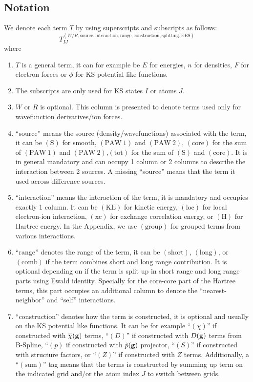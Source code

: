 \documentclass[paper=a4, fontsize=11pt]{article} %
\numberwithin{equation}{section} %
\numberwithin{figure}{section} %
\numberwithin{table}{section} %
\newcommand{\ol}{\overline}
\newcommand{\bg}{{\bf{g}}}
\newcommand{\rS}{{\mathrm{S}}}
\newcommand{\rKE}{{\mathrm{KE}}}
\newcommand{\rEES}{{\mathrm{EES}}}
\newcommand{\rxc}{{\mathrm{xc}}}
\newcommand{\rgr}{{\mathrm{group}}}
\newcommand{\rcore}{{\mathrm{core}}}
\newcommand{\rshort}{{\mathrm{short}}}
\newcommand{\rlong}{{\mathrm{long}}}
\newcommand{\rP}{{\mathrm{PAW}}}
\newcommand{\rH}{{\mathrm{H}}}
\newcommand{\rsum}{{\mathrm{sum}}}
\newcommand{\rcomb}{{\mathrm{comb}}}
\newcommand{\rlo}{{\mathrm{loc}}}
\newcommand{\rtot}{{\mathrm{tot}}}
\begin{document}
\subsection{Notation}
We denote each term $T$ by using superscripts and subscripts as follows:
\begin{equation}
T^{(W/R,\mathrm{source},\mathrm{interaction},\mathrm{range},\mathrm{construction},\mathrm{splitting},\rEES)}_{IJ}
\end{equation}
where
\begin{enumerate}
\item $T$ is a general term, it can for example be $E$ for energies, $n$ for densities, $F$ for electron forces or $\phi$ for KS potential like functions.
\item The subscripts are only used for KS states $I$ or atoms $J$.
\item $W$ or $R$ is optional. This column is presented to denote terms used only for wavefunction derivatives/ion forces.
\item ``source'' means the source (density/wavefunctions) associated with the term, it can be $(\rS)$ for smooth, $(\rP\ 1)$ and $(\rP\ 2)$, $(\rcore)$ for the sum of $(\rP\ 1)$ and $(\rP\ 2)$,$(\rtot)$ for the sum of $(\rS)$ and $(\rcore)$. It is in general mandatory and can occupy 1 column or 2 columns to describe the interaction between 2 sources. A missing ``source'' means that the term it used across difference sources.
\item ``interaction'' means the interaction of the term, it is mandatory and occupies exactly 1 column. It can be $(\rKE)$ for kinetic energy, $(\rlo)$ for local electron-ion interaction, $(\rxc)$ for exchange correlation energy, or $(\rH)$ for Hartree energy. In the Appendix, we use $(\rgr)$ for grouped terms from various interactions.
\item ``range'' denotes the range of the term, it can be $(\rshort)$, $(\rlong)$, or $(\rcomb)$ if the term combines short and long range contribution. It is optional depending on if the term is split up in short range and long range parts using Ewald identity. Specially for the core-core part of the Hartree terms, this part occupies an additional column to denote the ``nearest-neighbor'' and ``self'' interactions.
\item ``construction'' denotes how the term is constructed, it is optional and usually on the KS potential like functions. It can be for example ``$(\chi)$'' if constructed with $\ol \chi(\bg)$ terms, ``$(D)$'' if constructed with $D(\bg)$ terms from B-Spline, ``$(p)$ if constructed with $\tilde p(\bg)$ projector, ``$(S)$'' if constructed with structure factors, or ``$(Z)$'' if constructed with $Z$ terms. Additionally, a ``$(\rsum)$'' tag means that the terms is constructed by summing up term on the indicated grid and/or the atom index $J$ to switch between grids.  

\end{enumerate}
\end{document}
